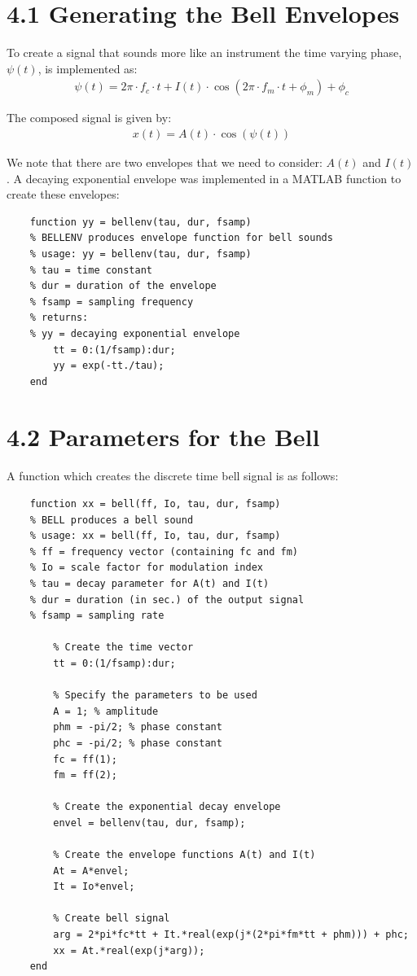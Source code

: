\documentclass{article}
\begin{document}
\section{4.1 Generating the Bell Envelopes}

To create a signal that sounds more like an instrument the time varying phase, $\psi(t)$, is implemented as:
\begin{align}
	\psi(t) = 2 \pi \cdot f_c \cdot t + I(t) \cdot \cos(2 \pi \cdot f_m \cdot t + \phi_m) + \phi_c
\end{align}

The composed signal is given by:
\begin{align}
	x(t) = A(t) \cdot \cos(\psi(t))
\end{align}

We note that there are two envelopes that we need to consider: $A(t)$ and $I(t)$. A decaying exponential envelope was implemented in a MATLAB function to create these envelopes:
\begin{lstlisting}
	function yy = bellenv(tau, dur, fsamp)
	% BELLENV produces envelope function for bell sounds
	% usage: yy = bellenv(tau, dur, fsamp)
	% tau = time constant
	% dur = duration of the envelope
	% fsamp = sampling frequency
	% returns:
	% yy = decaying exponential envelope
	    tt = 0:(1/fsamp):dur;
	    yy = exp(-tt./tau);
	end
\end{lstlisting}

\section{4.2 Parameters for the Bell}
A function which creates the discrete time bell signal is as follows:
\begin{lstlisting}
	function xx = bell(ff, Io, tau, dur, fsamp)
	% BELL produces a bell sound
	% usage: xx = bell(ff, Io, tau, dur, fsamp)
	% ff = frequency vector (containing fc and fm)
	% Io = scale factor for modulation index
	% tau = decay parameter for A(t) and I(t)
	% dur = duration (in sec.) of the output signal
	% fsamp = sampling rate
	    
	    % Create the time vector
	    tt = 0:(1/fsamp):dur;
	    
	    % Specify the parameters to be used
	    A = 1; % amplitude
	    phm = -pi/2; % phase constant
	    phc = -pi/2; % phase constant
	    fc = ff(1);
	    fm = ff(2);
	    
	    % Create the exponential decay envelope
	    envel = bellenv(tau, dur, fsamp);
	    
	    % Create the envelope functions A(t) and I(t)
	    At = A*envel;
	    It = Io*envel;
	    
	    % Create bell signal
	    arg = 2*pi*fc*tt + It.*real(exp(j*(2*pi*fm*tt + phm))) + phc;
	    xx = At.*real(exp(j*arg));
	end
\end{lstlisting}
\end{document}
